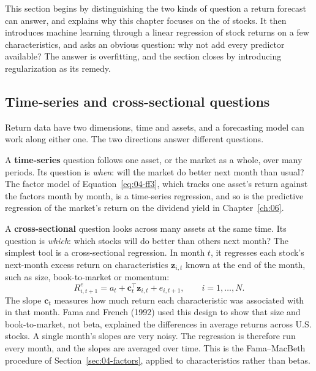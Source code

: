 This section begins by distinguishing the two kinds of question a return forecast can answer, and explains why this chapter focuses on the  of stocks. It then introduces machine learning through a linear regression of stock returns on a few characteristics, and asks an obvious question: why not add every predictor available? The answer is overfitting, and the section closes by introducing regularization as its remedy.

\subsection{Time-series and cross-sectional questions}
\label{sec:20-crosssection}

Return data have two dimensions, time and assets, and a forecasting model can work along either one. The two directions answer different questions.

A \textbf{time-series} question follows one asset, or the market as a whole, over many periods. Its question is \emph{when}: will the market do better next month than usual? The factor model of Equation~\eqref{eq:04-ff3}, which tracks one asset's return against the factors month by month, is a time-series regression, and so is the predictive regression of the market's return on the dividend yield in Chapter~\ref{ch:06}.

A \textbf{cross-sectional} question looks across many assets at the same time. Its question is \emph{which}: which stocks will do better than others next month? The simplest tool is a cross-sectional regression. In month $t$, it regresses each stock's next-month excess return on characteristics $\mathbf{z}_{i,t}$ known at the end of the month, such as size, book-to-market or momentum:
\begin{equation}
  R^{e}_{i,t+1} = a_t + \mathbf{c}_t^{\top} \mathbf{z}_{i,t} + e_{i,t+1}, \qquad i = 1, \dots, N.
  \label{eq:20-xs}
\end{equation}
The slope $\mathbf{c}_t$ measures how much return each characteristic was associated with in that month. Fama and French (1992) used this design to show that size and book-to-market, not beta, explained the differences in average returns across U.S. stocks. A single month's slopes are very noisy. The regression is therefore run every month, and the slopes are averaged over time. This is the Fama--MacBeth procedure of Section~\ref{sec:04-factors}, applied to characteristics rather than betas.

